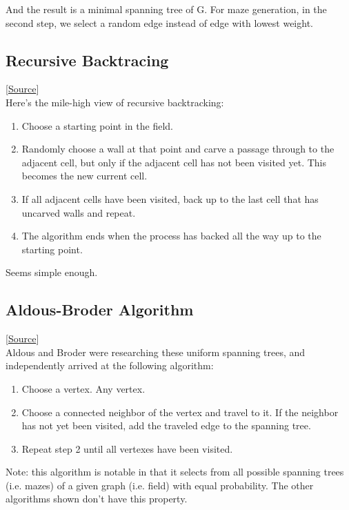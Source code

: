 \documentclass{article}
\begin{document}
And the result is a minimal spanning tree of G. For maze generation, in the second step, we select a random edge instead of edge with lowest weight.

\subsection*{Recursive Backtracing}
[\href{https://weblog.jamisbuck.org/2010/12/27/maze-generation-recursive-backtracking}{Source}]\\
Here's the mile-high view of recursive backtracking:
\begin{enumerate}
    \item Choose a starting point in the field.
    \item Randomly choose a wall at that point and carve a passage through to the adjacent cell, but only if the adjacent cell has not been visited yet. This becomes the new current cell.
    \item If all adjacent cells have been visited, back up to the last cell that has uncarved walls and repeat.
    \item The algorithm ends when the process has backed all the way up to the starting point.
\end{enumerate}

Seems simple enough.

\subsection*{Aldous-Broder Algorithm}
[\href{https://weblog.jamisbuck.org/2011/1/17/maze-generation-aldous-broder-algorithm}{Source}]\\
Aldous and Broder were researching these uniform spanning trees, and independently arrived at the following algorithm:
\begin{enumerate}
    \item Choose a vertex. Any vertex.
    \item Choose a connected neighbor of the vertex and travel to it. If the neighbor has not yet been visited, add the traveled edge to the spanning tree.
    \item Repeat step 2 until all vertexes have been visited.
\end{enumerate}

Note: this algorithm is notable in that it selects from all possible spanning trees (i.e. mazes) of a given graph (i.e. field) with equal probability. The other algorithms shown don't have this property.
\end{document}
